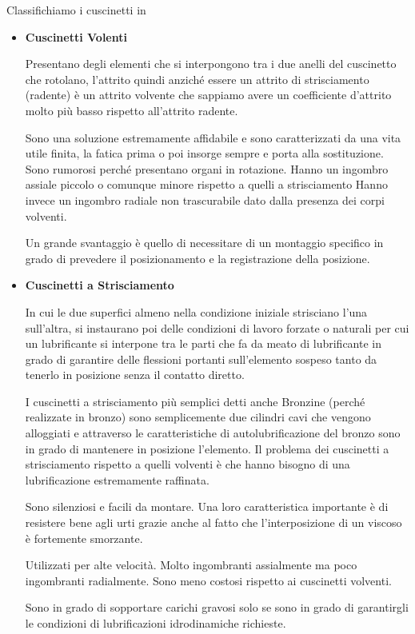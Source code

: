 \documentclass[a4paper, 15pt]{article}
\begin{document}
			Classifichiamo i cuscinetti in
			\begin{itemize}
				\item	\textbf{Cuscinetti Volenti} 
				
				Presentano degli elementi che si interpongono tra i due anelli del cuscinetto che rotolano, l’attrito quindi anziché essere un attrito di strisciamento (radente) è un attrito volvente che sappiamo avere un coefficiente d’attrito molto più basso rispetto all’attrito radente. \newline 
				
				Sono una soluzione estremamente affidabile e sono caratterizzati da una vita utile finita, la fatica prima o poi insorge sempre e porta alla sostituzione.
				Sono rumorosi perché presentano organi in rotazione.
				Hanno un ingombro assiale piccolo o comunque minore rispetto a quelli a strisciamento
				Hanno invece un ingombro radiale non trascurabile dato dalla presenza dei corpi volventi. \newline 
				
				Un grande svantaggio è quello di necessitare di un montaggio specifico in grado di prevedere il posizionamento e la registrazione della posizione. 
				
				
			\item 	\textbf{Cuscinetti a Strisciamento}
			
			In cui le due superfici almeno nella condizione iniziale strisciano l’una sull’altra, si instaurano poi delle condizioni di lavoro forzate o naturali per cui un lubrificante si interpone tra le parti che fa da meato di lubrificante in grado di garantire delle flessioni portanti sull’elemento sospeso tanto da tenerlo in posizione senza il contatto diretto. \newline 
			
			I cuscinetti a strisciamento più semplici detti anche Bronzine (perché realizzate in bronzo) sono semplicemente due cilindri cavi che vengono alloggiati e attraverso le caratteristiche di autolubrificazione del bronzo sono in grado di mantenere in posizione l’elemento.
			Il problema dei cuscinetti a strisciamento rispetto a quelli volventi è che hanno bisogno di una lubrificazione estremamente raffinata. \newline 
			
			Sono silenziosi e facili da montare.
			Una loro caratteristica importante è di resistere bene agli urti grazie anche al fatto che l’interposizione di un viscoso è fortemente smorzante. \newline 
			
			Utilizzati per alte velocità.
			Molto ingombranti assialmente ma poco ingombranti radialmente.
			Sono meno costosi rispetto ai cuscinetti volventi. 
			
			Sono in grado di sopportare carichi gravosi solo se sono in grado di garantirgli le condizioni di lubrificazioni idrodinamiche richieste. 
			
			
			\end{itemize}
			
\end{document}
